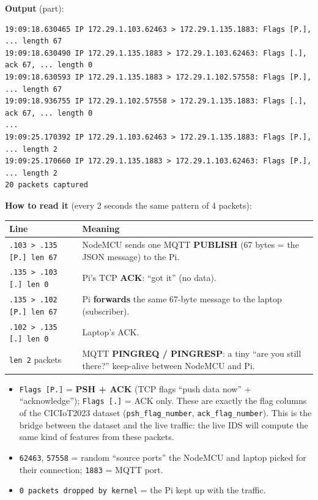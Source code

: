 \documentclass[11pt]{article}
\begin{document}
\textbf{Output} (part):
{\small
\begin{verbatim}
19:09:18.630465 IP 172.29.1.103.62463 > 172.29.1.135.1883: Flags [P.], ... length 67
19:09:18.630490 IP 172.29.1.135.1883 > 172.29.1.103.62463: Flags [.], ack 67, ... length 0
19:09:18.630593 IP 172.29.1.135.1883 > 172.29.1.102.57558: Flags [P.], ... length 67
19:09:18.936755 IP 172.29.1.102.57558 > 172.29.1.135.1883: Flags [.], ack 67, ... length 0
...
19:09:25.170392 IP 172.29.1.103.62463 > 172.29.1.135.1883: Flags [P.], ... length 2
19:09:25.170660 IP 172.29.1.135.1883 > 172.29.1.103.62463: Flags [P.], ... length 2
20 packets captured
\end{verbatim}
}

\textbf{How to read it} (every 2 seconds the same pattern of 4 packets):

\noindent\begin{tabular}{@{}>{\raggedright}p{4.8cm} >{\raggedright\arraybackslash}p{11.2cm}@{}}
\toprule
\textbf{Line} & \textbf{Meaning} \\
\midrule
\texttt{.103 > .135 [P.] len 67} & NodeMCU sends one MQTT \textbf{PUBLISH} (67 bytes = the JSON message) to the Pi. \\
\texttt{.135 > .103 [.] len 0} & Pi's TCP \textbf{ACK}: ``got it'' (no data). \\
\texttt{.135 > .102 [P.] len 67} & Pi \textbf{forwards} the same 67-byte message to the laptop (subscriber). \\
\texttt{.102 > .135 [.] len 0} & Laptop's ACK. \\
\texttt{len 2} packets & MQTT \textbf{PINGREQ / PINGRESP}: a tiny ``are you still there?'' keep-alive between NodeMCU and Pi. \\
\bottomrule
\end{tabular}

\begin{itemize}
\item \texttt{Flags [P.]} = \textbf{PSH + ACK} (TCP flags ``push data now'' + ``acknowledge''); \texttt{Flags [.]} = ACK only.
These are exactly the flag columns of the CICIoT2023 dataset (\texttt{psh\_flag\_number}, \texttt{ack\_flag\_number}). This is the bridge between the dataset
and the live traffic: the live IDS will compute the same kind of features from these packets.
\item \texttt{62463}, \texttt{57558} = random ``source ports'' the NodeMCU and laptop picked for their connection; \texttt{1883} = MQTT port.
\item \texttt{0 packets dropped by kernel} = the Pi kept up with the traffic.
\end{itemize}
\end{document}
